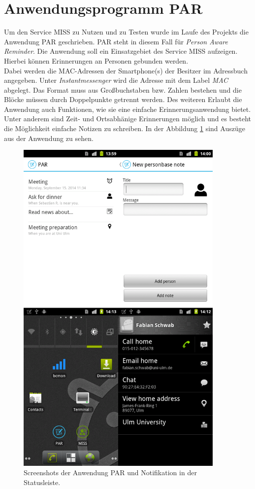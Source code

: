 \documentclass[]{report}
\begin{document}
\section{Anwendungsprogramm PAR}\label{lab:par}
Um den Service MISS zu Nutzen und zu Testen wurde im Laufe des Projekts die Anwendung PAR geschrieben. PAR steht in diesem Fall für \textit{Person Aware Reminder}. Die Anwendung soll ein Einsatzgebiet des Service MISS aufzeigen. Hierbei können Erinnerungen an Personen gebunden werden. \\
Dabei werden die MAC-Adressen der Smartphone(s) der Besitzer im Adressbuch angegeben. Unter \textit{Instantmessenger} wird die Adresse mit dem Label \textit{MAC} abgelegt. Das Format muss aus Großbuchstaben bzw. Zahlen bestehen und die Blöcke müssen durch Doppelpunkte getrennt werden. Des weiteren Erlaubt die Anwendung auch Funktionen, wie sie eine einfache Erinnerungsanwendung bietet. Unter anderem sind Zeit- und Ortsabhänige Erinnerungen möglich und es besteht die Möglichkeit einfache Notizen zu schreiben. In der Abbildung \ref{fig:par} sind Auszüge aus der Anwendung zu sehen. 
\begin{figure}[h!]
    \centering 
    \includegraphics[width=4.0in]{bilder/par.png}
    \caption{Screenshots der Anwendung PAR und Notifikation in der Statusleiste.}
    \label{fig:par}
\end{figure}
\end{document}
